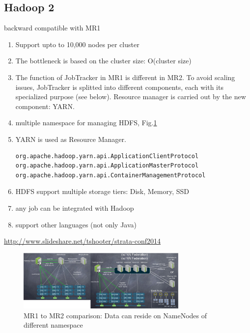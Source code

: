 \subsection{Hadoop 2}

backward compatible with MR1
\begin{enumerate}
  \item Support upto to 10,000 nodes per cluster
  \item The bottleneck is based on the cluster size: O(cluster size)
  \item The function of JobTracker in MR1 is different in MR2. To avoid
  scaling issues, JobTracker is splitted into different components, each with
  its specialized purpose (see below). Resource manager is carried out by the new component: YARN.
  
  \item multiple namespace for managing HDFS, Fig.\ref{fig:MR1_MR2_comparison_02}
  \item YARN is used as Resource Manager.
\begin{verbatim}
org.apache.hadoop.yarn.api.ApplicationClientProtocol
org.apache.hadoop.yarn.api.ApplicationMasterProtocol
org.apache.hadoop.yarn.api.ContainerManagementProtocol
\end{verbatim}  
  
  \item HDFS support multiple storage tiers: Disk, Memory, SSD
  
  \item any job can be integrated with Hadoop
  \item support other languages (not only Java)
\end{enumerate}
\url{http://www.slideshare.net/tshooter/strata-conf2014}

\begin{figure}[hbt]
  \centerline{\includegraphics[height=3cm,
    angle=0]{./images/MR1_MR2_comparison_02.eps}}
  \caption{MR1 to MR2 comparison: Data can reside on NameNodes of different
  namespace}
  \label{fig:MR1_MR2_comparison_02}
\end{figure}


